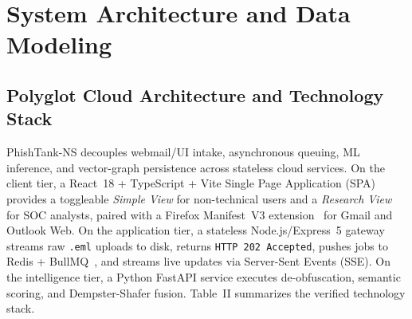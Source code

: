 \documentclass[conference]{IEEEtran}
\begin{document}
\begin{table}[htbp]
\caption{Comparative Evaluation of Phishing Defense Approaches}
\centering
{}
\label{tab:comparison}
\end{table}

\section{System Architecture and Data Modeling}

\subsection{Polyglot Cloud Architecture and Technology Stack}
PhishTank-NS decouples webmail/UI intake, asynchronous queuing, ML inference, and vector-graph persistence across stateless cloud services. On the client tier, a React~18 + TypeScript + Vite Single Page Application (SPA) provides a toggleable \emph{Simple View} for non-technical users and a \emph{Research View} for SOC analysts, paired with a Firefox Manifest~V3 extension~\cite{mozilla2024mv3} for Gmail and Outlook Web. On the application tier, a stateless Node.js/Express~5 gateway streams raw \texttt{.eml} uploads to disk, returns \texttt{HTTP 202 Accepted}, pushes jobs to Redis + BullMQ~\cite{bullmq2024}, and streams live updates via Server-Sent Events (SSE). On the intelligence tier, a Python FastAPI service executes de-obfuscation, semantic scoring, and Dempster-Shafer fusion. Table~II summarizes the verified technology stack.
\end{document}

